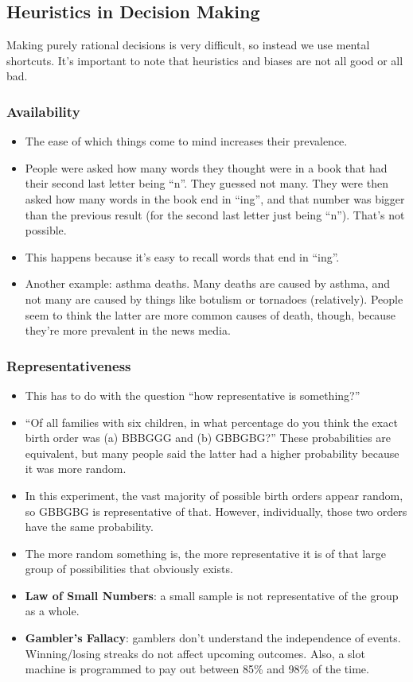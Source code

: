 \documentclass[]{article}
\begin{document}
		\subsection{Heuristics in Decision Making}
			Making purely rational decisions is very difficult, so instead we use mental shortcuts. It's important to note that heuristics and biases are not all good or all bad.
			\subsubsection{Availability}
				\begin{itemize}
					\item The ease of which things come to mind increases their prevalence.
					\item People were asked how many words they thought were in a book that had their second last letter being ``n''. They guessed not many. They were then asked how many words in the book end in ``ing'', and that number was bigger than the previous result (for the second last letter just being ``n''). That's not possible.
					\item This happens because it's easy to recall words that end in ``ing''.
					\item Another example: asthma deaths. Many deaths are caused by asthma, and not many are caused by things like botulism or tornadoes (relatively). People seem to think the latter are more common causes of death, though, because they're more prevalent in the news media.
				\end{itemize}

			\subsubsection{Representativeness}
				\begin{itemize}
					\item This has to do with the question ``how representative is something?''
					\item ``Of all families with six children, in what percentage do you think the exact birth order was (a) BBBGGG and (b) GBBGBG?'' These probabilities are equivalent, but many people said the latter had a higher probability because it was more random.
					\item In this experiment, the vast majority of possible birth orders appear random, so GBBGBG is representative of that. However, individually, those two orders have the same probability.
					\item The more random something is, the more representative it is of that large group of possibilities that obviously exists.
					\item \textbf{Law of Small Numbers}: a small sample is not representative of the group as a whole.
					\item \textbf{Gambler's Fallacy}: gamblers don't understand the independence of events. Winning/losing streaks do not affect upcoming outcomes. Also, a slot machine is programmed to pay out between 85\% and 98\% of the time.
				\end{itemize}
\end{document}
